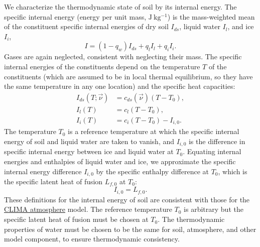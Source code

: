 \documentclass{report}
\begin{document}
We characterize the thermodynamic state of soil by its internal energy. The specific internal energy (energy per unit mass, $\mathrm{J~kg^{-1}}$) is the mass-weighted mean of the constituent specific internal energies of dry soil $I_{ds}$, liquid water $I_l$, and ice $I_i$,
\begin{equation}\label{e:energy_soil}
    I = (1-q_w) I_{ds} + q_l I_l + q_i I_i.
\end{equation}
Gases are again neglected, consistent with neglecting their mass. The specific internal energies of the constituents depend on the temperature $T$ of the constituents (which are assumed to be in local thermal equilibrium, so they have the same temperature in any one location) and the specific heat capacities:
\begin{subequations}\label{e:soil_internal_energies}
\begin{align}
I_{ds}(T; \vec{\nu}) & = c_{ds}(\vec{\nu}) (T - T_0),  \\
I_l(T) & = c_{l} (T - T_0), \\
I_i(T) & = c_{i} (T - T_0) - I_{i,0}.
\end{align}
\end{subequations}
The temperature $T_0$ is a reference temperature at which the specific internal energy of soil and liquid water are taken to vanish, and $I_{i,0}$ is the difference in specific internal energy between ice and liquid water at $T_0$. Equating internal energies and enthalpies of liquid water and ice, we approximate the specific internal energy difference $I_{i,0}$ by the specific enthalpy difference at $T_0$, which is the specific latent heat of fusion $L_{f,0}$ at $T_0$: 
\begin{equation}
    I_{i,0} = L_{f,0}.
\end{equation} 
These definitions for the internal energy of soil are consistent with those for the \href{https://github.com/climate-machine/Design-Docs/blob/master/CLIMA-atmos/}{CLIMA atmosphere} model. The reference temperature $T_0$ is arbitrary but the specific latent heat of fusion must be chosen at $T_0$. The thermodynamic properties of water must be chosen to be the same for soil, atmosphere, and other model component, to ensure thermodynamic consistency. 
\end{document}
